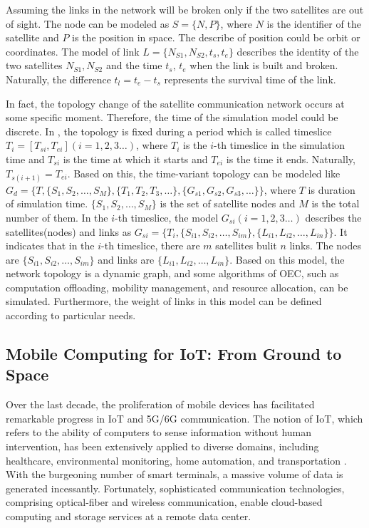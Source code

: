 \documentclass[lettersize,journal]{IEEEtran}
\begin{document}
Assuming the links in the network will be broken only if the two satellites are out of sight. The node can be modeled as $S=\{N,P\}$, where $N$ is the identifier of the satellite and $P$ is the position in space. The describe of position could be orbit or coordinates. The model of link $L=\{N_{S1},N_{S2},t_s,t_e\}$ describes the identity of the two satellites $N_{S1},N_{S2}$ and the time $t_s$, $t_e$ when the link is built and broken. Naturally, the difference $t_l=t_e-t_s$ represents the survival time of the link.

In fact, the topology change of the satellite communication network occurs at some specific moment. Therefore, the time of the simulation model could be discrete. In \cite{RN196}, the topology is fixed during a period which is called timeslice $T_i=[T_{si},T_{ei}](i=1,2,3\ldots)$, where $T_i$ is the $i$-th timeslice in the simulation time and $T_{si}$ is the time at which it starts and $T_{ei}$ is the time it ends. Naturally, $T_{s(i+1)} = T_{ei}$. Based on this, the time-variant topology can be modeled like $G_d=\{T,\{S_1,S_2,\ldots,S_M\},\{T_1,T_2,T_3,\ldots\},\{G_{s1},G_{s2},G_{s3},\ldots\}\}$, where $T$ is duration of simulation time. $\{S_1,S_2,\ldots,S_M\}$ is the set of satellite nodes and $M$ is the total number of them. In the $i$-th timeslice, the model $G_{si}(i=1,2,3\ldots)$ describes the satellites(nodes) and links as $G_{si}=\{T_i,\{ S_{i1},S_{i2},\ldots,S_{im} \},\{L_{i1},L_{i2},\ldots,L_{in}\} \}$. It indicates that in the $i$-th timeslice, there are $m$ satellites bulit $n$ links. The nodes are $\{ S_{i1},S_{i2},\ldots,S_{im} \}$ and links are $\{L_{i1},L_{i2},\ldots,L_{in}\}$. Based on this model, the network topology is a dynamic graph, and some algorithms of OEC, such as computation offloading, mobility management, and resource allocation, can be simulated. Furthermore, the weight of links in this model can be defined according to particular needs.

\subsection{Mobile Computing for IoT: From Ground to Space}
Over the last decade, the proliferation of mobile devices has facilitated remarkable progress in IoT and 5G/6G communication. The notion of IoT, which refers to the ability of computers to sense information without human intervention, has been extensively applied to diverse domains, including healthcare, environmental monitoring, home automation, and transportation \cite{RN152,RN154}. With the burgeoning number of smart terminals, a massive volume of data is generated incessantly. Fortunately, sophisticated communication technologies, comprising optical-fiber and wireless communication, enable cloud-based computing and storage services at a remote data center.
\end{document}
